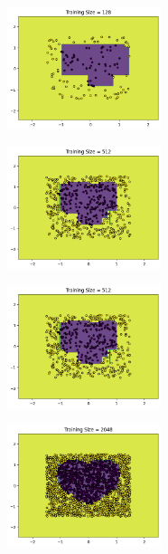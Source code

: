 \documentclass[a4paper]{article}
\theoremstyle{definition}
\begin{document}
\begin{enumerate}
  \begin{figure}[H]
  	\centering
  	\includegraphics[width=0.4\textwidth]{q73.png}  
  	\captionsetup{labelformat=empty}
  	\caption{}
  	\label{fig:my_label}
  \end{figure}
  
  \begin{figure}[H]
  	\centering
  	\includegraphics[width=0.4\textwidth]{q74.png}  
  	\captionsetup{labelformat=empty}
  	\caption{}
  	\label{fig:my_label}
  \end{figure}
  
  \begin{figure}[H]
  	\centering
  	\includegraphics[width=0.4\textwidth]{q75.png}  
  	\captionsetup{labelformat=empty}
  	\caption{}
  	\label{fig:my_label}
  \end{figure}
  
  \begin{figure}[H]
  	\centering
  	\includegraphics[width=0.4\textwidth]{q76.png}  
  	\captionsetup{labelformat=empty}
  	\caption{}
  	\label{fig:my_label}
  \end{figure}
  

\end{enumerate}
\end{document}
